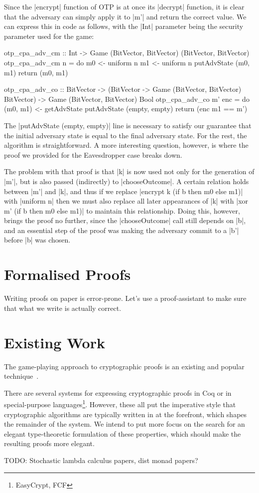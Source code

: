 Since the |encrypt| function of OTP is at once its |decrypt| function, it is clear that the adversary can simply apply
it to |m'| and return the correct value.  We can express this in code as follows, with the |Int| parameter being the
security parameter used for the game:
\begin{code}
    otp_cpa_adv_cm :: Int -> Game (BitVector, BitVector) (BitVector, BitVector)
    otp_cpa_adv_cm n = do
        m0 <- uniform n
        m1 <- uniform n
        putAdvState (m0, m1)
        return (m0, m1)

    otp_cpa_adv_co :: BitVector
                   -> (BitVector -> Game (BitVector, BitVector) BitVector)
                   -> Game (BitVector, BitVector) Bool
    otp_cpa_adv_co m' enc = do
        (m0, m1) <- getAdvState
        putAdvState (empty, empty)
        return (enc m1 == m')
\end{code}

The |putAdvState (empty, empty)| line is necessary to satisfy our guarantee that the initial adversary state is equal to
the final adversary state.  For the rest, the algorithm is straightforward.  A more interesting question, however, is
where the proof we provided for the Eavesdropper case breaks down.

The problem with that proof is that |k| is now used not only for the generation of |m'|, but is also passed (indirectly)
to |chooseOutcome|.  A certain relation holds between |m'| and |k|, and thus if we replace |encrypt k (if b then m0 else
m1)| with |uniform n| then we must also replace all later appearances of |k| with |xor m' (if b then m0 else m1)| to
maintain this relationship.  Doing this, however, brings the proof no further, since the |chooseOutcome| call still
depends on |b|, and an essential step of the proof was making the adversary commit to a |b'| before |b| was chosen.

\section{Formalised Proofs}

Writing proofs on paper is error-prone.  Let's use a proof-assistant to make sure that what we write is actually
correct.

\section{Existing Work}

The game-playing approach to cryptographic proofs is an existing and popular technique~\cite{codebasedgames}.

There are several systems for expressing cryptographic proofs in Coq or in special-purpose
languages\footnote{EasyCrypt, FCF}.  However, these all put the imperative style that cryptographic algorithms are
typically written in at the forefront, which shapes the remainder of the system.  We intend to put more focus on the
search for an elegant type-theoretic formulation of these properties, which should make the resulting proofs more
elegant.

TODO: Stochastic lambda calculus papers, dist monad papers?
